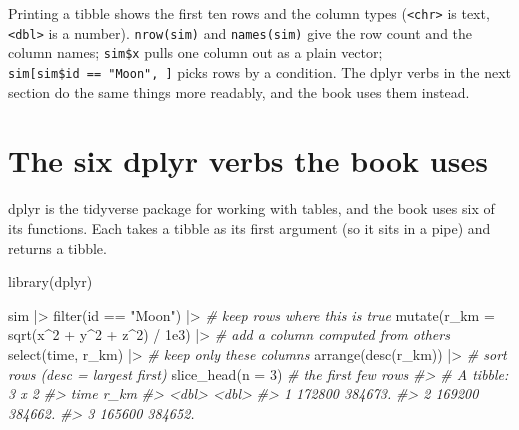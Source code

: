 \documentclass[
  10.5pt,
  letterpaper,
]{scrbook}
\newenvironment{Shaded}{\begin{snugshade}}{\end{snugshade}}
\newcommand{\AttributeTok}[1]{\textcolor[rgb]{0.00,0.00,0.00}{#1}}
\newcommand{\CommentTok}[1]{\textcolor[rgb]{0.00,0.00,0.00}{\textit{#1}}}
\newcommand{\DecValTok}[1]{\textcolor[rgb]{0.00,0.00,0.00}{#1}}
\newcommand{\FloatTok}[1]{\textcolor[rgb]{0.00,0.00,0.00}{#1}}
\newcommand{\FunctionTok}[1]{\textcolor[rgb]{0.00,0.00,0.00}{#1}}
\newcommand{\NormalTok}[1]{\textcolor[rgb]{0.00,0.00,0.00}{#1}}
\newcommand{\SpecialCharTok}[1]{\textcolor[rgb]{0.00,0.00,0.00}{#1}}
\newcommand{\StringTok}[1]{\textcolor[rgb]{0.00,0.00,0.00}{#1}}
\theoremstyle{plain}
\theoremstyle{remark}
\begin{document}
Printing a tibble shows the first ten rows and the column types
(\texttt{\textless{}chr\textgreater{}} is text,
\texttt{\textless{}dbl\textgreater{}} is a number). \texttt{nrow(sim)}
and \texttt{names(sim)} give the row count and the column names;
\texttt{sim\$x} pulls one column out as a plain vector;
\texttt{sim{[}sim\$id\ ==\ "Moon",\ {]}} picks rows by a condition. The
dplyr verbs in the next section do the same things more readably, and
the book uses them instead.

\section{The six dplyr verbs the book
uses}\label{the-six-dplyr-verbs-the-book-uses}

dplyr is the tidyverse package for working with tables, and the book
uses six of its functions. Each takes a tibble as its first argument (so
it sits in a pipe) and returns a tibble.

\begin{Shaded}
\begin{Highlighting}[]
\FunctionTok{library}\NormalTok{(dplyr)}

\NormalTok{sim }\SpecialCharTok{|\textgreater{}}
  \FunctionTok{filter}\NormalTok{(id }\SpecialCharTok{==} \StringTok{"Moon"}\NormalTok{) }\SpecialCharTok{|\textgreater{}}                      \CommentTok{\# keep rows where this is true}
  \FunctionTok{mutate}\NormalTok{(}\AttributeTok{r\_km =} \FunctionTok{sqrt}\NormalTok{(x}\SpecialCharTok{\^{}}\DecValTok{2} \SpecialCharTok{+}\NormalTok{ y}\SpecialCharTok{\^{}}\DecValTok{2} \SpecialCharTok{+}\NormalTok{ z}\SpecialCharTok{\^{}}\DecValTok{2}\NormalTok{) }\SpecialCharTok{/} \FloatTok{1e3}\NormalTok{) }\SpecialCharTok{|\textgreater{}} \CommentTok{\# add a column computed from others}
  \FunctionTok{select}\NormalTok{(time, r\_km) }\SpecialCharTok{|\textgreater{}}                        \CommentTok{\# keep only these columns}
  \FunctionTok{arrange}\NormalTok{(}\FunctionTok{desc}\NormalTok{(r\_km)) }\SpecialCharTok{|\textgreater{}}                       \CommentTok{\# sort rows (desc = largest first)}
  \FunctionTok{slice\_head}\NormalTok{(}\AttributeTok{n =} \DecValTok{3}\NormalTok{)                            }\CommentTok{\# the first few rows}
\CommentTok{\#\textgreater{} \# A tibble: 3 x 2}
\CommentTok{\#\textgreater{}     time    r\_km}
\CommentTok{\#\textgreater{}    \textless{}dbl\textgreater{}   \textless{}dbl\textgreater{}}
\CommentTok{\#\textgreater{} 1 172800 384673.}
\CommentTok{\#\textgreater{} 2 169200 384662.}
\CommentTok{\#\textgreater{} 3 165600 384652.}
\end{Highlighting}
\end{Shaded}
\end{document}
